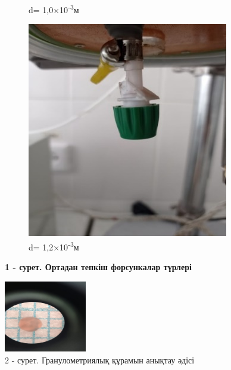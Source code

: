 \begin{figure}[H]
\begin{subfigure}[b]{0.32\textwidth}
		\caption*{d= 1,0×10\textsuperscript{-3}м}
	\end{subfigure}
	\hfill
	\begin{subfigure}[b]{0.32\textwidth}
		\centering
		\includegraphics[width=\textwidth,height=\textwidth]{media/pish/image22}
		\caption*{d= 1,2×10\textsuperscript{-3}м}
	\end{subfigure}
	\caption*{\bfseries 1 - сурет. Ортадан тепкіш форсункалар түрлері}
\end{figure}

\begin{figure}[H]
	\centering
	\includegraphics[width=0.32\textwidth]{media/pish/image23}
	\caption*{2 - сурет. Гранулометриялық құрамын анықтау әдісі}
\end{figure}


